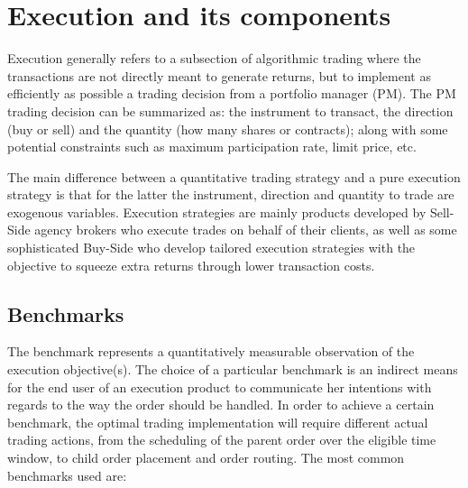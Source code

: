 \section{Execution and its components}

Execution generally refers to a subsection of algorithmic trading where the transactions are not directly meant to generate returns, but to implement as efficiently as possible a trading decision from a portfolio manager (PM). The PM trading decision can be summarized as: the instrument to transact, the direction (buy or sell) and the quantity (how many shares or contracts); along with some potential constraints such as maximum participation rate, limit price, etc.


The main difference between a quantitative trading strategy and a pure execution strategy is that for the latter the instrument, direction and quantity to trade are exogenous variables. Execution strategies are mainly products developed by Sell-Side agency brokers who execute trades on behalf of their clients, as well as some sophisticated Buy-Side who develop tailored execution strategies with the objective to squeeze extra returns through lower transaction costs.


\subsection{Benchmarks}

The benchmark represents a quantitatively measurable observation of the execution objective(s). The choice of a particular benchmark is an indirect means for the end user of an execution product to communicate her intentions with regards to the way the order should be handled. In order to achieve a certain benchmark, the optimal trading implementation will require different actual trading actions, from the scheduling of the parent order over the eligible time window, to child order placement and order routing. The most common benchmarks used are:

